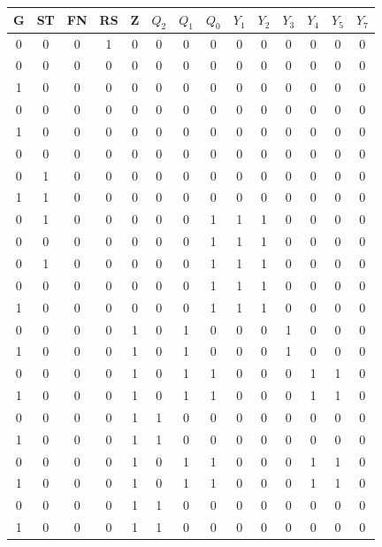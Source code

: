 \documentclass[a4paper, 10pt]{article}
\begin{document}
\begin{table}[h!]
\centering
\begin{tabular}{|c|c|c|c|c|c|c|c|c|c|c|c|c|c|}
\hline
 G & ST & FN & RS & Z & $Q_2$ & $Q_1$ & $Q_0$ & $Y_1$ & $Y_2$ & $Y_3$ & $Y_4$ & $Y_5$ & $Y_7$\\
\hline
0 & 0 & 0 & 1 & 0 & 0 & 0 & 0 & 0 & 0 & 0 & 0 & 0 & 0\\
\hline
0 & 0 & 0 & 0 & 0 & 0 & 0 & 0 & 0 & 0 & 0 & 0 & 0 & 0\\
\hline
1 & 0 & 0 & 0 & 0 & 0 & 0 & 0 & 0 & 0 & 0 & 0 & 0 & 0\\
\hline
0 & 0 & 0 & 0 & 0 & 0 & 0 & 0 & 0 & 0 & 0 & 0 & 0 & 0\\
\hline
1 & 0 & 0 & 0 & 0 & 0 & 0 & 0 & 0 & 0 & 0 & 0 & 0 & 0\\
\hline
0 & 0 & 0 & 0 & 0 & 0 & 0 & 0 & 0 & 0 & 0 & 0 & 0 & 0\\
\hline
0 & 1 & 0 & 0 & 0 & 0 & 0 & 0 & 0 & 0 & 0 & 0 & 0 & 0\\
\hline
1 & 1 & 0 & 0 & 0 & 0 & 0 & 0 & 0 & 0 & 0 & 0 & 0 & 0\\
\hline
0 & 1 & 0 & 0 & 0 & 0 & 0 & 1 & 1 & 1 & 0 & 0 & 0 & 0\\
\hline
0 & 0 & 0 & 0 & 0 & 0 & 0 & 1 & 1 & 1 & 0 & 0 & 0 & 0\\
\hline
0 & 1 & 0 & 0 & 0 & 0 & 0 & 1 & 1 & 1 & 0 & 0 & 0 & 0\\
\hline
0 & 0 & 0 & 0 & 0 & 0 & 0 & 1 & 1 & 1 & 0 & 0 & 0 & 0\\
\hline
1 & 0 & 0 & 0 & 0 & 0 & 0 & 1 & 1 & 1 & 0 & 0 & 0 & 0\\
\hline
0 & 0 & 0 & 0 & 1 & 0 & 1 & 0 & 0 & 0 & 1 & 0 & 0 & 0\\
\hline
1 & 0 & 0 & 0 & 1 & 0 & 1 & 0 & 0 & 0 & 1 & 0 & 0 & 0\\
\hline
0 & 0 & 0 & 0 & 1 & 0 & 1 & 1 & 0 & 0 & 0 & 1 & 1 & 0\\
\hline
1 & 0 & 0 & 0 & 1 & 0 & 1 & 1 & 0 & 0 & 0 & 1 & 1 & 0\\
\hline
0 & 0 & 0 & 0 & 1 & 1 & 0 & 0 & 0 & 0 & 0 & 0 & 0 & 0\\
\hline
1 & 0 & 0 & 0 & 1 & 1 & 0 & 0 & 0 & 0 & 0 & 0 & 0 & 0\\
\hline
0 & 0 & 0 & 0 & 1 & 0 & 1 & 1 & 0 & 0 & 0 & 1 & 1 & 0\\
\hline
1 & 0 & 0 & 0 & 1 & 0 & 1 & 1 & 0 & 0 & 0 & 1 & 1 & 0\\
\hline
0 & 0 & 0 & 0 & 1 & 1 & 0 & 0 & 0 & 0 & 0 & 0 & 0 & 0\\
\hline
1 & 0 & 0 & 0 & 1 & 1 & 0 & 0 & 0 & 0 & 0 & 0 & 0 & 0\\

\end{tabular}
\end{table}
\end{document}
